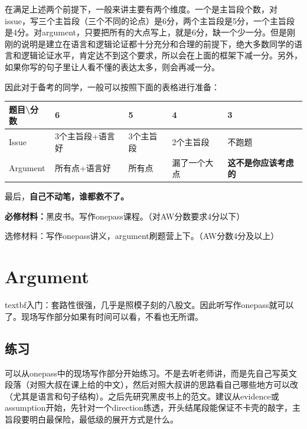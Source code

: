 \documentclass[cn,plain]{elegantbookex}
\newenvironment{material}{\begin{tcolorbox}[title={材料}]}{\end{tcolorbox}}
\begin{document}
在满足上述两个前提下，一般来讲主要有两个维度。一个是主旨段个数，对issue，写三个主旨段（三个不同的论点）是6分，两个主旨段是5分，一个主旨段是4分。对argument，只要把所有的大点写上，就是6分，缺一个少一分。但是刚刚的说明是建立在语言和逻辑论证都十分充分和合理的前提下，绝大多数同学的语言和逻辑论证水平，肯定达不到这个要求，所以会在上面的框架下减一分。另外，如果你写的句子里让人看不懂的表达太多，则会再减一分。

因此对于备考的同学，一般可以按照下面的表格进行准备：

\begin{longtable}[]{@{}lllll@{}}
\toprule
题目\textbackslash{}分数 & 6 & 5 & 4 & 3\tabularnewline
\midrule
\endhead
Issue & 3个主旨段+语言好 & 3个主旨段 & 2个主旨段 & 不跑题\tabularnewline
Argument & 所有点+语言好 & 所有点 & 漏了一个大点 &
\textbf{这不是你应该考虑的}\tabularnewline
\bottomrule
\end{longtable}

最后，\textbf{自己不动笔，谁都救不了。}

\begin{material}
\textbf{必修材料：}黑皮书。写作onepass课程。（对AW分数要求4分以下）

选修材料：写作onepass讲义，argument刷题营上下。（AW分数4分及以上）
\end{material}

\section{Argument}
textbf{入门：}套路性很强，几乎是照模子刻的八股文。因此听写作onepass就可以了。现场写作部分如果有时间可以看，不看也无所谓。

\subsection{练习}
可以从onepass中的现场写作部分开始练习。不是去听老师讲，而是先自己写英文段落（对照大叔在课上给的中文），然后对照大叔讲的思路看自己哪些地方可以改（尤其是语言和句子结构）。之后先研究黑皮书上的范文。建议从evidence或assumption开始，先针对一个direction练透，开头结尾段能保证不卡壳的敲字，主旨段要明白最保险，最低级的展开方式是什么。
\end{document}
